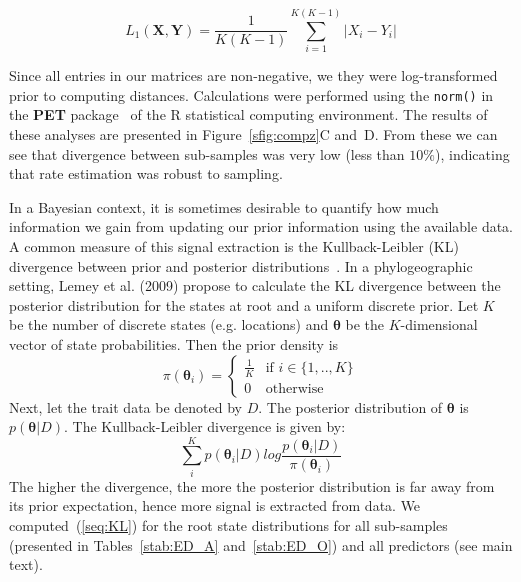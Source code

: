 \documentclass[a4paper,10pt]{article}
\begin{document}
\begin{equation}
\label{seq:L1}
 L_1 (\mathbf{X}, \mathbf{Y}) = \frac{1}{K(K-1)} \sum_{i=1}^{K(K-1)} |X_i-Y_i|  
\end{equation}

Since all entries in our matrices are non-negative, we they were log-transformed prior to computing distances.
Calculations were performed using the \verb|norm()| in the \textbf{PET} package~\cite{PET} of the R statistical computing environment.
The results of these analyses are presented in Figure~\ref{sfig:compz}C and~D.
From these we can see that divergence between sub-samples was very low (less than $10\%$), indicating that rate estimation was robust to sampling.

In a Bayesian context, it is sometimes desirable to quantify how much information we gain from updating our prior information using the available data.
A common measure of this signal extraction is the Kullback-Leibler (KL) divergence between prior and posterior distributions~\cite{M-KL}.
In a phylogeographic setting, Lemey et al. (2009) \cite{M-roots} propose to calculate the KL divergence between the posterior distribution for the states at root and a uniform discrete prior.
Let $K$ be the number of discrete states (e.g. locations) and $\boldsymbol\theta$ be the $K$-dimensional vector of state probabilities.
Then the prior density is
\begin{equation}
\label{seq:prior}
\pi(\boldsymbol\theta_i)  = \begin{cases}  \frac{1}{K} &\mbox{if } i \in \{1,..,K\}  \\ 
0 & \mbox{otherwise} \end{cases}
\end{equation}
Next, let the trait data be denoted by $D$.
The posterior distribution of $\boldsymbol\theta$ is $p(\boldsymbol\theta|D)$.
The Kullback-Leibler divergence is given by:
\begin{equation}
\label{seq:KL}
\sum_{i}^{K} p(\boldsymbol\theta_i|D)log\frac{p(\boldsymbol\theta_i|D)}{\pi(\boldsymbol\theta_i)}
\end{equation}
The higher the divergence, the more the posterior distribution is far away from its prior expectation, hence more signal is extracted from data.
We computed~(\ref{seq:KL}) for the root state distributions for all sub-samples (presented in Tables~\ref{stab:ED_A} and~\ref{stab:ED_O}) and all predictors (see main text).
\end{document}
